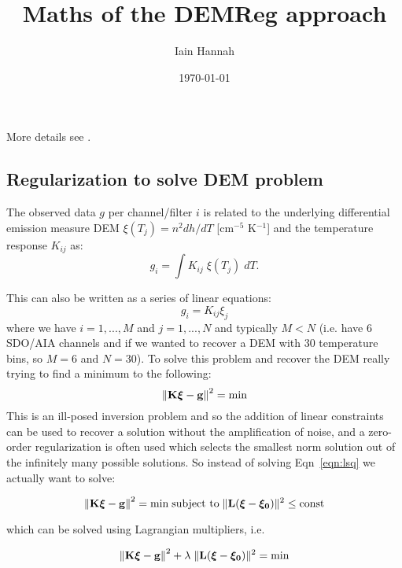 \documentclass[12pt,a4paper]{article}
\title{Maths of the DEMReg approach}
\author{Iain Hannah}
\date{\today}
\begin{document}
\maketitle\thispagestyle{fancy}

More details see \citet{2012A&A...539A.146H,2013A&A...553A..10H,2004SoPh..225..293K,1992InvPr...8..849H}.

\vspace{-10pt}
\subsection*{Regularization to solve DEM problem}

The observed data $g$ per channel/filter $i$ is related to the underlying differential emission measure DEM $\xi(T_j)=n^2 dh/dT$ [cm$^{-5}$ K$^{-1}$] and the temperature response $K_{ij}$ as:
\begin{equation}\label{eqn:org}
    g_i=\int K_{ij}\;\xi(T_j)\; dT.
\end{equation}

This can also be written as a series of linear equations:
\begin{equation}\label{eqn:le}
    g_i=K_{ij}\xi_j
\end{equation}
where we have $i=1,...,M$ and $j=1,...,N$ and typically $M<N$ (i.e. have 6 SDO/AIA channels and if we wanted to recover a DEM with 30 temperature bins, so $M=6$ and $N=30$). To solve this problem and recover the DEM really trying to find a minimum to the following:
\begin{equation}\label{eqn:lsq}
    \left\|\bf{K\boldsymbol{\xi}-g}\right\|^2=\mbox{min}
\end{equation}
This is an ill-posed inversion problem and so the addition of linear constraints can be used to recover a solution without the amplification of noise, and a zero-order regularization is often used which selects the smallest norm solution out of the infinitely many possible solutions. So instead of solving Eqn~\ref{eqn:lsq} we actually want to solve:

\begin{equation}
    \left\|\bf{K\boldsymbol{\xi}-g}\right\|^2  =  \mathrm{min}  \;
\mbox{subject to} \; \| {\bf L (\boldsymbol{\xi}-\boldsymbol{\xi_0})}\|^2\le \mathrm{const}
\end{equation}

which can be solved using Lagrangian multipliers, i.e.

\begin{equation}\label{eqn:lc}
    \left\|\bf{K\boldsymbol{\xi}-g}\right\|^2 +\lambda\;\| {\bf L (\boldsymbol{\xi}-\boldsymbol{\xi_0})}\|^2=\mathrm{min}
\end{equation}
\end{document}
